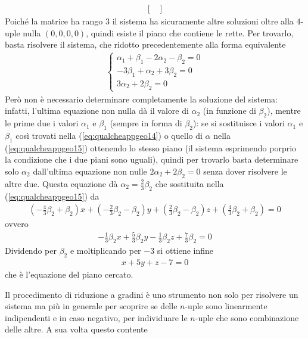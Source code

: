 \begin{es}
\begin{eqnarray*}
\begin{bmatrix}
    \end{bmatrix}
  \end{eqnarray*}
  Poiché la matrice ha rango 3 il sistema ha sicuramente altre soluzioni
  oltre alla 4-uple nulla $(0,0,0,0)$, quindi esiste il piano che contiene
  le rette. Per trovarlo, basta risolvere il sistema, che ridotto
  precedentemente alla forma equivalente
  \begin{eqnarray*}
    \begin{cases}
      \alpha_1+\beta_1-2\alpha_2-\beta_2=0\\
      -3\beta_1+\alpha_2+3\beta_2=0\\
      3\alpha_2+2\beta_2=0
    \end{cases}
  \end{eqnarray*}
  Però non è necessario determinare completamente la soluzione del
  sistema: infatti, l'ultima equazione non nulla dà il valore di
  $\alpha_2$ (in funzione di $\beta_2$), mentre le prime due i valori
  $\alpha_1$ e $\beta_1$ (sempre in forma di $\beta_2$): se si sostituisce
  i valori $\alpha_1$ e $\beta_1$ così trovati nella
  (\ref{eq:qualcheappgeo14}) o quello di $\alpha$ nella
  (\ref{eq:qualcheappgeo15}) ottenendo lo stesso piano (il sistema
  esprimendo porprio la condizione che i due piani sono uguali), quindi
  per trovarlo basta determinare solo $\alpha_2$ dall'ultima equazione non
  nulle $2\alpha_2+2\beta_2=0$ senza dover risolvere le altre due.
  Questa equazione dà $\alpha_2=\frac{2}{3}\beta_2$ che sostituita nella
  (\ref{eq:qualcheappgeo15}) da
  \begin{eqnarray*}
    \left(-\frac{4}{3}\beta_2+\beta_2\right)x+\left(-\frac{2}{3}\beta_2
    -\beta_2\right)y+\left(\frac{2}{3}\beta_2-\beta_2\right)z+
    \left(\frac{4}{3}\beta_2+\beta_2\right)=0
  \end{eqnarray*}
  ovvero
  \begin{eqnarray*}
    -\frac{1}{3}\beta_2x+\frac{5}{3}\beta_2y-\frac{1}{3}\beta_2z+
    \frac{7}{3}\beta_2=0
  \end{eqnarray*}
  Dividendo per $\beta_2$ e moltiplicando per $-3$ si ottiene infine
  \begin{eqnarray*}
    x+5y+z-7=0
  \end{eqnarray*}
  che è l'equazione del piano cercato.
\end{es}
Il procedimento di riduzione a gradini è uno strumento non solo per
risolvere un sistema ma più in generale per scoprire se delle $n$-uple
sono linearmente indipendenti e in caso negativo, per individuare le
$n$-uple che sono combinazione delle altre. A sua volta questo contente
